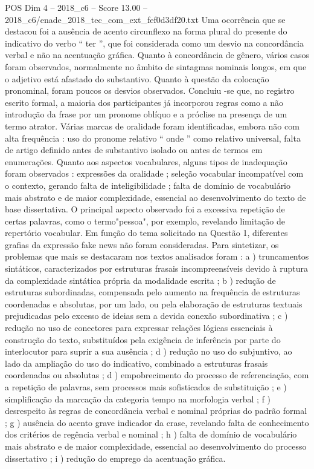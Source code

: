 \begin{textsample}{POS Dim 4 – 2018\_c6 – Score 13.00 – 2018\_c6/enade\_2018\_tec\_com\_ext\_fef0d3df20.txt}
Uma ocorrência que se destacou foi a ausência de acento circunflexo na forma plural do presente do indicativo do verbo “ ter ”, que foi considerada como um desvio na concordância verbal e não na acentuação gráfica.
Quanto à concordância de gênero, vários casos foram observados, normalmente no âmbito de sintagmas nominais longos, em que o adjetivo está afastado do substantivo.
Quanto à questão da colocação pronominal, foram poucos os desvios observados.
Concluiu -se que, no registro escrito formal, a maioria dos participantes já incorporou regras como a não introdução da frase por um pronome oblíquo e a próclise na presença de um termo atrator.
Várias marcas de oralidade foram identificadas, embora não com alta frequência : uso do pronome relativo “ onde ” como relativo universal, falta de artigo definido antes de substantivo isolado ou antes de termos em enumerações.
Quanto aos aspectos vocabulares, alguns tipos de inadequação foram observados : expressões da oralidade ; seleção vocabular incompatível com o contexto, gerando falta de inteligibilidade ; falta de domínio de vocabulário mais abstrato e de maior complexidade, essencial ao desenvolvimento do texto de base dissertativa.
O principal aspecto observado foi a excessiva repetição de certas palavras, como o termo"pessoa", por exemplo, revelando limitação de repertório vocabular.
Em função do tema solicitado na Questão 1, diferentes grafias da expressão fake news não foram consideradas.
Para sintetizar, os problemas que mais se destacaram nos textos analisados foram : a ) truncamentos sintáticos, caracterizados por estruturas frasais incompreensíveis devido à ruptura da complexidade sintática própria da modalidade escrita ; b ) redução de estruturas subordinadas, compensada pelo aumento na frequência de estruturas coordenadas e absolutas, por um lado, ou pela elaboração de estruturas textuais prejudicadas pelo excesso de ideias sem a devida conexão subordinativa ; c ) redução no uso de conectores para expressar relações lógicas essenciais à construção do texto, substituídos pela exigência de inferência por parte do interlocutor para suprir a sua ausência ; d ) redução no uso do subjuntivo, ao lado da ampliação do uso do indicativo, combinado a estruturas frasais coordenadas ou absolutas ; d ) empobrecimento do processo de referenciação, com a repetição de palavras, sem processos mais sofisticados de substituição ; e ) simplificação da marcação da categoria tempo na morfologia verbal ; f ) desrespeito às regras de concordância verbal e nominal próprias do padrão formal ; g ) ausência do acento grave indicador da crase, revelando falta de conhecimento dos critérios de regência verbal e nominal ; h ) falta de domínio de vocabulário mais abstrato e de maior complexidade, essencial ao desenvolvimento do processo dissertativo ; i ) redução do emprego da acentuação gráfica.

\end{textsample}
